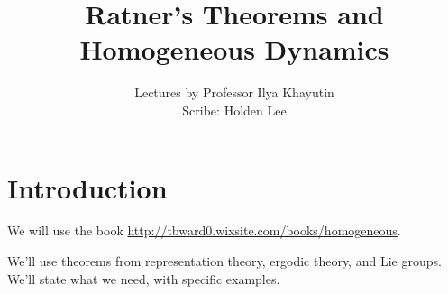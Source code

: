 \def\filepath{templates}








\def\name{Ratner's Theorems and Homogeneous Dynamics}


\pagestyle{fancy}
\chead{} 
\lfoot{} 
\cfoot{\thepage} 
\rfoot{} %
\renewcommand{\headrulewidth}{.3pt} 
\setlength\voffset{0in}


%
\title{Ratner's Theorems and Homogeneous Dynamics}
\author{Lectures by Professor Ilya Khayutin\\ Scribe: Holden Lee}
\maketitle


\tableofcontents


\chapter*{Introduction}

We will use the book \url{http://tbward0.wixsite.com/books/homogeneous}.

We'll use theorems from representation theory, ergodic theory, and Lie groups. We'll state what we need, with specific examples.














%

%
%

\printnomenclature
\printindex
